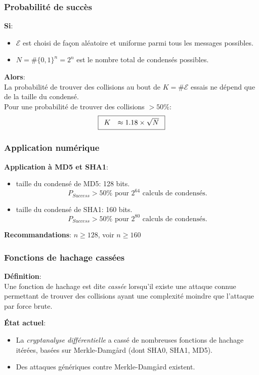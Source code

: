 \begin{frame}
  \frametitle{Probabilité de succès}
  \vfill
  \textbf{Si}:
  \begin{itemize}
        \item $\mathcal{E}$ est choisi de façon aléatoire et uniforme parmi tous les messages possibles.
        \item $N = \# \{0,1\}^n = 2^n $ est le nombre total de condensés possibles.
  \end{itemize}
  \vspace{1cm}
  \textbf{Alors}:\\ 
  La probabilité de trouver des collisions au bout de $K=\# \mathcal{E}$ essais ne dépend que de la taille du condensé.\\
  \vspace{0.5cm} 
Pour une probabilité de trouver des collisions \textbf{$>50\%$}:
\begin{equation}
   \fbox{$
   \begin{array}{rcl}
      K & \approx 1.18 \times \sqrt{N}\\
   \end{array}
   $}
   \end{equation}
  \vfill
\end{frame}

\begin{frame}
  \frametitle{Application numérique}
  \vfill

\textbf{Application à MD5 et SHA1}:
\begin{itemize}
\item taille du condensé de MD5: 128 bits.
$$P_{Success} > 50\% \mbox{ pour } 2^{64} \mbox{ calculs de condensés.}$$
\item taille du condensé de SHA1: 160 bits.
$$P_{Success} > 50\% \mbox{ pour } 2^{80} \mbox{ calculs de condensés.}$$
\end{itemize}
  \vspace{0.3cm}
\textbf{Recommandations}: $n \ge 128$, voir $n\ge 160$
  \vfill
\end{frame}

\begin{frame}[fragile]
  \frametitle{Fonctions de hachage cassées}
  \vfill
\textbf{Définition}:\\
Une fonction de hachage est dite \emph{cassée} lorsqu'il existe une attaque connue permettant de trouver des collisions ayant une complexité moindre que l'attaque par force brute.
  \vspace{1.5cm}
  
\textbf{État actuel}:\\
\begin{itemize}
\item{La \emph{cryptanalyse différentielle} a cassé de nombreuses fonctions de hachage itérées, basées sur Merkle-Damg\r{a}rd (dont SHA0, SHA1, MD5).}
\item{Des attaques génériques contre Merkle-Damg\r{a}rd existent. }
\end{itemize}
  \vfill
\end{frame}



